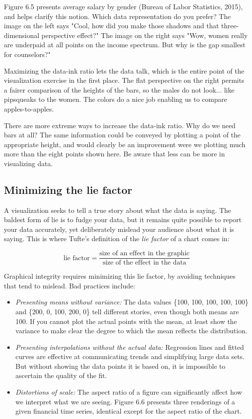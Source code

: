 \documentclass[10pt]{article}
\begin{document}
Figure 6.5 presents average salary by gender (Bureau of Labor Statistics, 2015), and helps clarify this notion. Which data representation do you prefer? The image on the left says "Cool, how did you make those shadows and that three-dimensional perspective effect?" The image on the right says "Wow, women really are underpaid at all points on the income spectrum. But why is the gap smallest for counselors?"

Maximizing the data-ink ratio lets the data talk, which is the entire point of the visualization exercise in the first place. The flat perspective on the right permits a fairer comparison of the heights of the bars, so the males do not look...
\textbf{}\newline
like pipsqueaks to the women. The colors do a nice job enabling us to compare apples-to-apples.

There are more extreme ways to increase the data-ink ratio. Why do we need bars at all? The same information could be conveyed by plotting a point of the appropriate height, and would clearly be an improvement were we plotting much more than the eight points shown here. Be aware that less can be more in visualizing data.

\subsection{Minimizing the lie factor}
A visualization seeks to tell a true story about what the data is saying. The baldest form of lie is to fudge your data, but it remains quite possible to report your data accurately, yet deliberately mislead your audience about what it is saying. This is where Tufte's definition of the \emph{lie factor} of a chart comes in:

\[
\text{lie factor} = \frac{\text{size of an effect in the graphic}}{\text{size of the effect in the data}}
\]

Graphical integrity requires minimizing this lie factor, by avoiding techniques that tend to mislead. Bad practices include:

\begin{itemize}
  \item \emph{Presenting means without variance:} The data values \{100, 100, 100, 100, 100\} and \{200, 0, 100, 200, 0\} tell different stories, even though both means are 100. If you cannot plot the actual points with the mean, at least show the variance to make clear the degree to which the mean reflects the distribution.
  \item \emph{Presenting interpolations without the actual data:} Regression lines and fitted curves are effective at communicating trends and simplifying large data sets. But without showing the data points it is based on, it is impossible to ascertain the quality of the fit.
  \item \emph{Distortions of scale:} The aspect ratio of a figure can significantly affect how we interpret what we are seeing. Figure 6.6 presents three renderings of a given financial time series, identical except for the aspect ratio of the chart.
\end{itemize}
\end{document}
